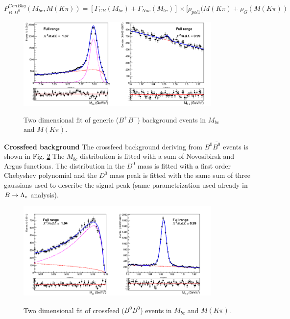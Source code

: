\begin{equation}
P^{GenBkg}_{B,D^0}(M_{bc}, M(K \pi)) = [\Gamma_{CB}(M_{bc}) + \Gamma_{Nov}(M_{bc})] \times [\rho_{pol1}(M(K \pi)+ \rho_{G}(M(K \pi))
 \end{equation}



\begin{figure}[H]
{\includegraphics[width=0.90\textwidth]{05-chargedControlSample/figs/chargedControlD0_Generic_2DFit.png}}
\caption{Two dimensional fit of generic ($B^+B^-$) background events in $M_{bc}$  and $M(K \pi)$.}
\label{fig:chargedControlD0_Generic_2DFit}
\end{figure}

\noindent \textbf{Crossfeed background}
\noindent The crossfeed background deriving from $B^0\bar{B^0}$ events is shown in Fig. \ref{fig:chargedControlD0_NeutralCrossfeed_2DFit} 
The $M_{bc}$  distribution is fitted with a sum of Novosibirsk and Argus functions.
The distribution in the $D^0$ mass is fitted with a first order Chebyshev polynomial and the $D^0$ mass peak is fitted with the same sum of three gaussians used to describe the signal peak (same parametrization used already in $B \rightarrow \Lambda_c$ analysis).

\begin{figure}[h!]
{\includegraphics[width=0.90\textwidth]{05-chargedControlSample/figs/NEW_chargedControlD0_NeutralCrossfeed_2DFit_.png}}
\caption{Two dimensional fit of crossfeed ($B^0\bar{B^0}$) events in $M_{bc}$  and $M(K \pi)$.}
\label{fig:chargedControlD0_NeutralCrossfeed_2DFit}
\end{figure}

